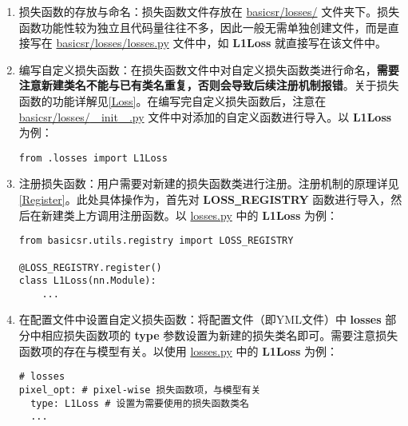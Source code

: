 \documentclass[../main.tex]{subfiles}
\begin{document}
\begin{enumerate}
	\item 损失函数的存放与命名：损失函数文件存放在 \href{https://github.com/XPixelGroup/BasicSR/tree/master/basicsr/losses}{basicsr/losses/} 文件夹下。损失函数功能性较为独立且代码量往往不多，因此一般无需单独创建文件，而是直接写在 \href{https://github.com/XPixelGroup/BasicSR/tree/master/basicsr/losses/losses.py}{basicsr/losses/losses.py} 文件中，如 \textbf{L1Loss} 就直接写在该文件中。
	
	\item 编写自定义损失函数：在损失函数文件中对自定义损失函数类进行命名，\textbf{需要注意新建类名不能与已有类名重复，否则会导致后续注册机制报错}。关于损失函数的功能详解见\ref{Loss}。在编写完自定义损失函数后，注意在 \href{https://github.com/XPixelGroup/BasicSR/tree/master/basicsr/losses/__init__.py}{basicsr/losses/\underline{~~}init\underline{~~}.py} 文件中对添加的自定义函数进行导入。以 \textbf{L1Loss} 为例：
\begin{verbatim}
from .losses import L1Loss
\end{verbatim}
	
	\item 注册损失函数：用户需要对新建的损失函数类进行注册。注册机制的原理详见\ref{Register}。此处具体操作为，首先对 \textbf{LOSS\underline{~}REGISTRY} 函数进行导入，然后在新建类上方调用注册函数。以 \href{https://github.com/XPixelGroup/BasicSR/tree/master/basicsr/losses/losses.py}{losses.py} 中的 \textbf{L1Loss} 为例：
\begin{verbatim}
from basicsr.utils.registry import LOSS_REGISTRY

@LOSS_REGISTRY.register()
class L1Loss(nn.Module):
    ...
\end{verbatim}
	
	\item 在配置文件中设置自定义损失函数：将配置文件（即YML文件）中 \textbf{losses} 部分中相应损失函数项的 \textbf{type} 参数设置为新建的损失类名即可。需要注意损失函数项的存在与模型有关。以使用 \href{https://github.com/XPixelGroup/BasicSR/tree/master/basicsr/losses/losses.py}{losses.py} 中的 \textbf{L1Loss} 为例：
\begin{verbatim}
# losses
pixel_opt: # pixel-wise 损失函数项，与模型有关
  type: L1Loss # 设置为需要使用的损失函数类名
  ...
\end{verbatim}
\end{enumerate}
\end{document}
